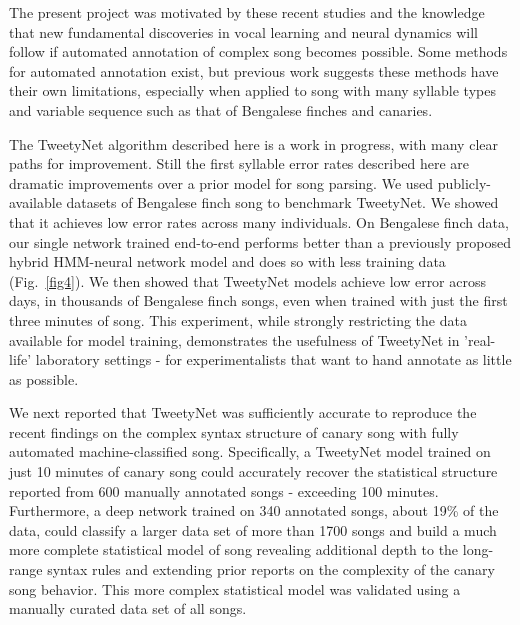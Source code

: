 \documentclass[10pt,letterpaper]{article}
\begin{document}
The present project was motivated by these recent studies and the knowledge that new fundamental discoveries in vocal learning and neural dynamics will follow if automated annotation of complex song becomes possible. Some methods for automated annotation exist, but previous work suggests these methods have their own limitations, especially when applied to song with many syllable types and variable sequence such as that of Bengalese finches and canaries. 

The TweetyNet algorithm described here is a work in progress, with many clear paths for improvement. Still the first syllable error rates described here are dramatic improvements over a prior model for song parsing. We used publicly-available datasets of Bengalese finch song to benchmark TweetyNet. We showed that it achieves low error rates across many individuals. On Bengalese finch data, our single network trained end-to-end performs better than a previously proposed hybrid HMM-neural network model and does so with less training data (Fig.~\ref{fig4}). We then showed that TweetyNet models achieve low error across days, in thousands of Bengalese finch songs, even when trained with just the first three minutes of song. This experiment, while strongly restricting the data available for model training, demonstrates the usefulness of TweetyNet in 'real-life' laboratory settings - for experimentalists that want to hand annotate as little as possible. 


We next reported that TweetyNet was sufficiently accurate to reproduce the recent findings on the complex syntax structure of canary song with fully automated machine-classified song.  Specifically, a TweetyNet model trained on just 10 minutes of canary song could accurately recover the statistical structure reported from 600 manually annotated songs - exceeding 100 minutes. Furthermore, a deep network trained on 340 annotated songs, about 19\% of the data, could classify a larger data set of more than 1700 songs and build a much more complete statistical model of song revealing additional depth to the long-range syntax rules and extending prior reports on the complexity of the canary song behavior. This more complex statistical model was validated using a manually curated data set of all songs.
\end{document}

